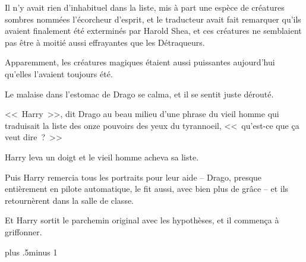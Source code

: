 Il n'y avait rien d'inhabituel dans la liste, mis à part une espèce de créatures sombres nommées l'écorcheur d'esprit, et le traducteur avait fait remarquer qu'ils avaient finalement été exterminés par Harold Shea, et ces créatures ne semblaient pas être à moitié aussi effrayantes que les Détraqueurs.

Apparemment, les créatures magiques étaient aussi puissantes aujourd'hui qu'elles l'avaient toujours été.

Le malaise dans l'estomac de Drago se calma, et il se sentit juste dérouté.

<<~Harry~>>, dit Drago au beau milieu d'une phrase du vieil homme qui traduisait la liste des onze pouvoirs des yeux du tyrannoeil, <<~qu'est-ce que ça veut dire~?~>>

Harry leva un doigt et le vieil homme acheva sa liste.

Puis Harry remercia tous les portraits pour leur aide -- Drago, presque entièrement en pilote automatique, le fit aussi, avec bien plus de grâce -- et ils retournèrent dans la salle de classe.

Et Harry sortit le parchemin original avec les hypothèses, et il commença à griffonner.

\baselineskip plus .5\textheight minus 1\baselineskip

\savetrivseps
\setlength{\topsep}{0pt}
\setlength{\partopsep}{0pt}

